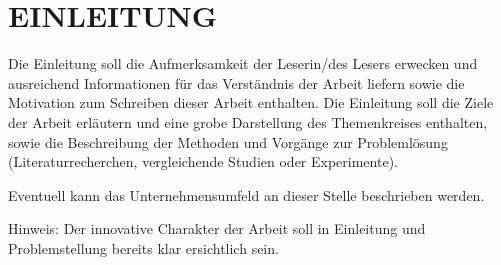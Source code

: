 \documentclass[./\jobname.tex]{subfiles}
\begin{document}
%
\section{EINLEITUNG}\raggedbottom
%
Die Einleitung soll die Aufmerksamkeit der Leserin/des Lesers erwecken und ausreichend Informationen für das Verständnis der Arbeit liefern sowie die Motivation zum Schreiben dieser Arbeit enthalten.
Die Einleitung soll die Ziele der Arbeit erläutern und eine grobe Darstellung des Themenkreises enthalten, sowie die Beschreibung der Methoden und Vorgänge zur Problemlösung (Literaturrecherchen, vergleichende Studien oder Experimente).\par
%
Eventuell kann das Unternehmensumfeld an dieser Stelle beschrieben werden.\par
%
Hinweis: Der innovative Charakter der Arbeit soll in Einleitung und Problemstellung bereits klar ersichtlich sein.
%
\end{document}
